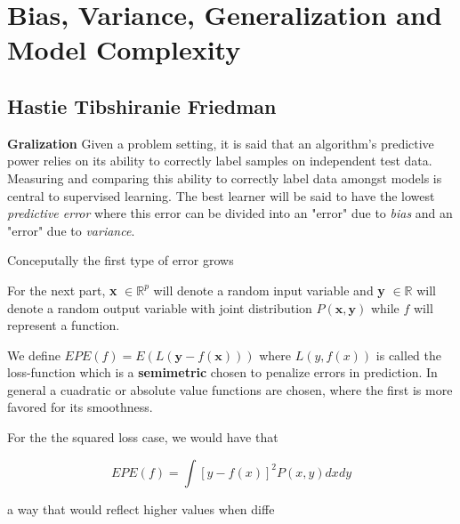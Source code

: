 
\section{Bias, Variance, Generalization and Model Complexity}

\subsection{Hastie Tibshiranie Friedman}

\textbf{Gralization}
Given a problem setting, it is said that an algorithm's predictive power relies on its ability to correctly label samples on independent test data. Measuring and comparing this ability to correctly label data amongst models is central to supervised learning.  The best learner will be said to have the lowest \textit{predictive error} where this error can be divided into an "error" due to \textit{bias} and an "error" due to \textit{variance}.

Conceputally the first type of error grows 


For the next part, \textbf{x} $\in \mathbb{R}^{p}$ will denote a random input variable and \textbf{y}  $\in \mathbb{R}$ will denote a random output variable with joint distribution $P\left(\textbf{x},\textbf{y}\right)$ while $f$ will represent a function. 

We define $EPE\left(f \right) = E\left(L\left(\textbf{y} - f(\textbf{x}) \right) \right)  $ where $L(y,f\left(x\right))$ is called the loss-function which is a \textbf{semimetric} chosen to penalize errors in prediction. In general a cuadratic or absolute value functions are chosen, where the first is more favored for its smoothness. 

For the the squared loss case, we would have that  

\begin{equation} \label{eq:expectedError}
EPE\left(f \right) = \int [y - f(x)]^2 P(x,y)dxdy
\end{equation}


a way that would reflect higher values when diffe




